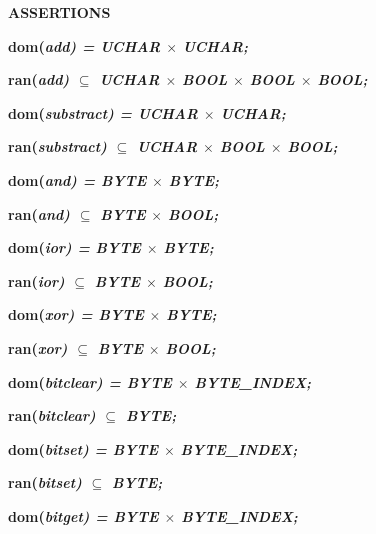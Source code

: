 \begin{sloppypar}
\vspace*{4mm}
\bf ASSERTIONS

\hspace*{0.20in}\bf dom\rm (\it add\rm ) \rm = \it UCHAR  $\times$  \it UCHAR\rm ;

\hspace*{0.20in}\bf ran\rm (\it add\rm )  $\subseteq$  \it UCHAR  $\times$  \bf BOOL  $\times$  \bf BOOL  $\times$  \bf BOOL\rm ;

\hspace*{0.20in}\bf dom\rm (\it substract\rm ) \rm = \it UCHAR  $\times$  \it UCHAR\rm ;

\hspace*{0.20in}\bf ran\rm (\it substract\rm )  $\subseteq$  \it UCHAR  $\times$  \bf BOOL  $\times$  \bf BOOL\rm ;

\hspace*{0.20in}\bf dom\rm (\it and\rm ) \rm = \it BYTE  $\times$  \it BYTE\rm ;

\hspace*{0.20in}\bf ran\rm (\it and\rm )  $\subseteq$  \it BYTE  $\times$  \bf BOOL\rm ;

\hspace*{0.20in}\bf dom\rm (\it ior\rm ) \rm = \it BYTE  $\times$  \it BYTE\rm ;

\hspace*{0.20in}\bf ran\rm (\it ior\rm )  $\subseteq$  \it BYTE  $\times$  \bf BOOL\rm ;

\hspace*{0.20in}\bf dom\rm (\it xor\rm ) \rm = \it BYTE  $\times$  \it BYTE\rm ;

\hspace*{0.20in}\bf ran\rm (\it xor\rm )  $\subseteq$  \it BYTE  $\times$  \bf BOOL\rm ;

\hspace*{0.20in}\bf dom\rm (\it bitclear\rm ) \rm = \it BYTE  $\times$  \it BYTE\_INDEX\rm ;

\hspace*{0.20in}\bf ran\rm (\it bitclear\rm )  $\subseteq$  \it BYTE\rm ;

\hspace*{0.20in}\bf dom\rm (\it bitset\rm ) \rm = \it BYTE  $\times$  \it BYTE\_INDEX\rm ;

\hspace*{0.20in}\bf ran\rm (\it bitset\rm )  $\subseteq$  \it BYTE\rm ;

\hspace*{0.20in}\bf dom\rm (\it bitget\rm ) \rm = \it BYTE  $\times$  \it BYTE\_INDEX\rm ;


\end{sloppypar}
